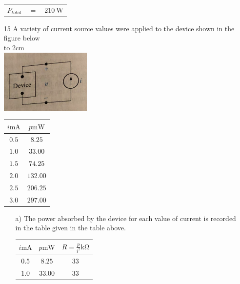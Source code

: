 \documentclass[a4paper]{article}
\begin{document}
\begin{itemize}
\begin{tabular}{r c l}
	      	$P_{total}$         & $=$ & $\SI{210}{\watt}$                       \\
	      \end{tabular}
	\item[15] A variety of current source values were applied to the device shown in the figure below \\
	      \hbox to 2cm{} \\	 
	      \includegraphics{P2-15.png} \\
	      \begin{tabular}{|c|c|}
	      	\hline
	      	$i\si{\milli\ampere}$ & $p\si{\milli\watt}$ \\
	      	\hline
	      	$0.5$                 & $8.25$              \\
	      	\hline
	      	$1.0$                 & $33.00$             \\
	      	\hline
	      	$1.5$                 & $74.25$             \\
	      	\hline
	      	$2.0$                 & $132.00$            \\
	      	\hline
	      	$2.5$                 & $206.25$            \\
	      	\hline
	      	$3.0$                 & $297.00$            \\
	      	\hline
	      \end{tabular}
	      \begin{itemize}
	      	\item[a)] The power absorbed by the device for each value of current is recorded in the table given in the table above. \\
	      	      \begin{tabular}{|c|c|c|}
	      	      	\hline
	      	      	$i\si{\milli\ampere}$ & $p\si{\milli\watt}$ & $R = \frac{p}{i^2}\si{\kilo\ohm}$ \\
	      	      	\hline
	      	      	$0.5$                 & $8.25$              & $33$                              \\
	      	      	\hline
	      	      	$1.0$                 & $33.00$             & $33$                              \\

\end{tabular}
\end{itemize}
\end{itemize}
\end{document}
